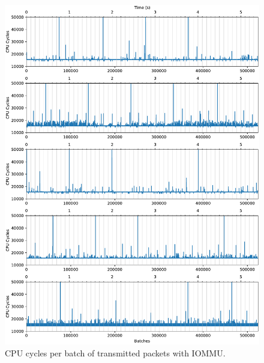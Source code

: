 \begin{figure}%
    \centering
    \includegraphics[width=1.0\textwidth]{figures/iotlb-baseline-iommu-pt}
    \caption{CPU cycles per batch of transmitted packets with IOMMU.}
    \label{fig:cycles-iommu-pt}
\end{figure}

